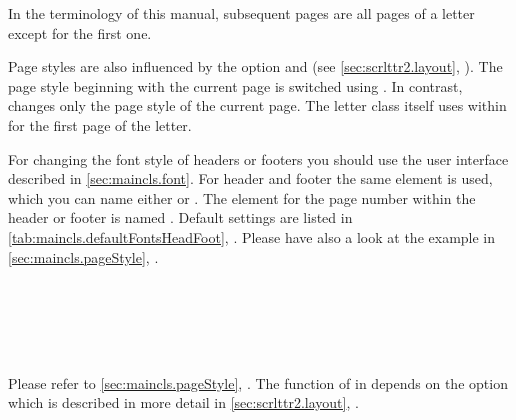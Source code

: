 In the terminology of this manual, subsequent pages are all pages of a
letter except for the first one.

Page styles are also influenced by the option
 and
 (see
\autoref{sec:scrlttr2.layout},
). The page style
beginning with the current page is switched using
. In contrast,  changes only the
page style of the current page. The letter class itself uses
 within
 for the first page of the letter.
%
%
%
%
%
%
%

%
For changing the font style of headers or footers you should use the
user interface described in \autoref{sec:maincls.font}.  For header
and footer the same element is used, which you can name either
 or
. The element for the
page number within the header or footer is named
.  Default
settings are listed in \autoref{tab:maincls.defaultFontsHeadFoot},
.  Please have also a
look at the example in \autoref{sec:maincls.pageStyle},
.
%
%

\begin{Declaration}
  \\
  \\
  \\
  \\
\end{Declaration}%
%
%
%
%
%
Please refer to \autoref{sec:maincls.pageStyle},
. The function
of  in  depends on the
option  which is described in more detail
in \autoref{sec:scrlttr2.layout},
.
%
%
%
%
%
%



